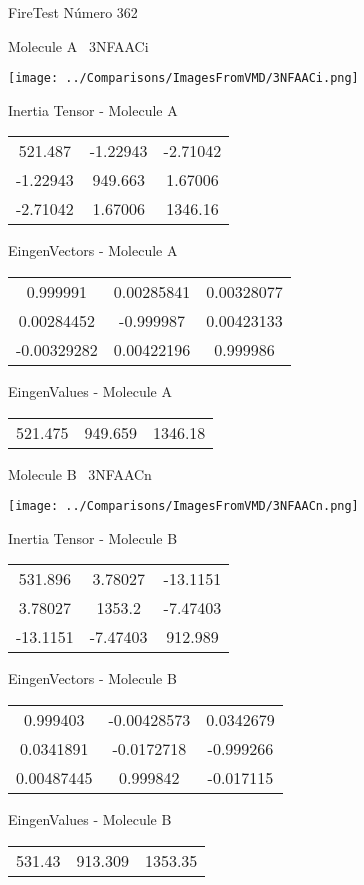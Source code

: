 \vtab[-3cm]
\begin{center}
{\large FireTest \tab Número 362}
\end{center}
\begin{multicols}{2}
\begin{center}

Molecule A \
3NFAACi

\texttt{[image: ../Comparisons/ImagesFromVMD/3NFAACi.png]}

Inertia Tensor - Molecule A \\
\begin{tabular}{|c c c|}
521.487	 & 	-1.22943	 & 	-2.71042	 \\
-1.22943	 & 	949.663	 & 	1.67006	 \\
-2.71042	 & 	1.67006	 & 	1346.16
\end{tabular}

\vtab
 EingenVectors - Molecule A     \\
\begin{tabular}{|c c c|}
0.999991	 & 	0.00285841	 & 	0.00328077	 \\
0.00284452	 & 	-0.999987	 & 	0.00423133	 \\
-0.00329282	 & 	0.00422196	 & 	0.999986
\end{tabular}

\vtab
 EingenValues - Molecule A     \\
\begin{tabular}{|c c c|}
521.475	 & 	949.659	 & 	1346.18	 \\
\end{tabular}
\columnbreak

Molecule B \
3NFAACn

\texttt{[image: ../Comparisons/ImagesFromVMD/3NFAACn.png]}

Inertia Tensor - Molecule B \\
\begin{tabular}{|c c c|}
531.896	 & 	3.78027	 & 	-13.1151	 \\
3.78027	 & 	1353.2	 & 	-7.47403	 \\
-13.1151	 & 	-7.47403	 & 	912.989
\end{tabular}

\vtab
 EingenVectors - Molecule B     \\
\begin{tabular}{|c c c|}
0.999403	 & 	-0.00428573	 & 	0.0342679	 \\
0.0341891	 & 	-0.0172718	 & 	-0.999266	 \\
0.00487445	 & 	0.999842	 & 	-0.017115
\end{tabular}

\vtab
 EingenValues - Molecule B     \\
\begin{tabular}{|c c c|}
531.43	 & 	913.309	 & 	1353.35	 \\
\end{tabular}

\end{center}
\end{multicols}

